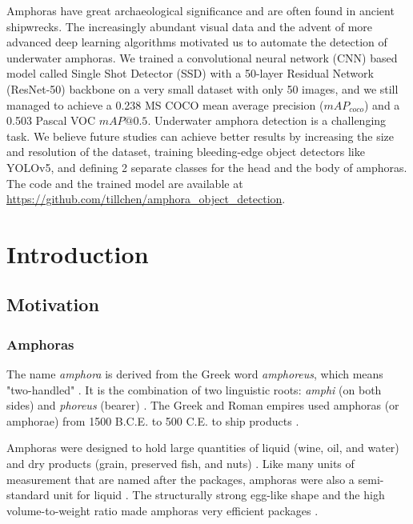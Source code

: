 \documentclass[a4paper, 11pt, oneside]{article}
\begin{document}
Amphoras have great archaeological significance and are often found in ancient shipwrecks. The increasingly abundant
visual data and the advent of more advanced deep learning algorithms motivated us to automate the detection of
underwater amphoras. We trained a convolutional neural network (CNN) based model called Single Shot Detector (SSD) with
a 50-layer Residual Network (ResNet-50) backbone on a very small dataset with only 50 images, and we still managed to
achieve a 0.238 MS COCO mean average precision ($mAP_{coco}$) and a 0.503 Pascal VOC $mAP@0.5$. Underwater amphora
detection is a challenging task. We believe future studies can achieve better results by increasing the size and
resolution of the dataset, training bleeding-edge object detectors like YOLOv5, and defining 2 separate classes for
the head and the body of amphoras. The code and the trained model are available at
\url{https://github.com/tillchen/amphora_object_detection}.

\newpage

\tableofcontents

\clearpage
{}

\section{Introduction}

\subsection{Motivation}

\subsubsection{Amphoras}

The name \textit{amphora} is derived from the Greek word \textit{amphoreus}, which means "two-handled"
\cite{harper2001online, twede2002commercial, will1977ancient}. It is the combination of two linguistic roots:
\textit{amphi} (on both sides) and \textit{phoreus} (bearer) \cite{harper2001online, twede2002commercial, will1977ancient}.
The Greek and Roman empires used amphoras (or amphorae) from 1500 B.C.E. to 500 C.E. to ship products
\cite{twede2002commercial, worldhistory}.

Amphoras were designed to hold large quantities of liquid (wine, oil, and water) and dry products (grain, preserved fish,
and nuts) \cite{twede2002commercial, foley2012aspects, grace1979amphoras}. Like many units of measurement that are named
after the packages, amphoras were also a semi-standard unit for liquid \cite{twede2002commercial}.
The structurally strong egg-like shape and the high volume-to-weight ratio made amphoras very efficient packages
\cite{twede2002commercial, worldhistory}.
\end{document}
